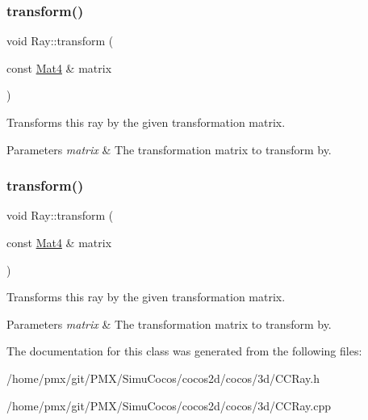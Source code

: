 \subsubsection{\texorpdfstring{transform()}{transform()}\hspace{0.1cm}{\footnotesize\ttfamily [1/2]}}
{\footnotesize\ttfamily void Ray\+::transform (\begin{DoxyParamCaption}\item[{const \hyperlink{classMat4}{Mat4} \&}]{matrix }\end{DoxyParamCaption})}

Transforms this ray by the given transformation matrix.


\begin{DoxyParams}{Parameters}
{\em matrix} & The transformation matrix to transform by. \\
\hline
\end{DoxyParams}
\mbox{\label{classRay_a23b3f4f7ecd94ef4ac74dba7c65fe110}} 
\subsubsection{\texorpdfstring{transform()}{transform()}\hspace{0.1cm}{\footnotesize\ttfamily [2/2]}}
{\footnotesize\ttfamily void Ray\+::transform (\begin{DoxyParamCaption}\item[{const \hyperlink{classMat4}{Mat4} \&}]{matrix }\end{DoxyParamCaption})}

Transforms this ray by the given transformation matrix.


\begin{DoxyParams}{Parameters}
{\em matrix} & The transformation matrix to transform by. \\
\hline
\end{DoxyParams}


The documentation for this class was generated from the following files\+:\begin{DoxyCompactItemize}
\item 
/home/pmx/git/\+P\+M\+X/\+Simu\+Cocos/cocos2d/cocos/3d/C\+C\+Ray.\+h\item 
/home/pmx/git/\+P\+M\+X/\+Simu\+Cocos/cocos2d/cocos/3d/C\+C\+Ray.\+cpp\end{DoxyCompactItemize}
